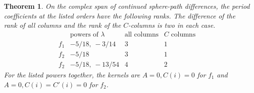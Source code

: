 \documentclass[11pt]{article}
\newtheorem{theorem}{Theorem}
\begin{document}
\begin{theorem}\label{thm:escaped-sphere}
On the complex span of continued sphere-path differences,
the period coefficients at the listed orders have the following ranks. The difference of the
rank of all columns and the rank of the \(C\)-columns is two
in each case.
\[
\begin{array}{c|c|cc}
 &\text{powers of }\lambda&\text{all columns}& C\text{ columns}\\ \hline
 f_1 & -5/18,\ -3/14 &3&1\\
 f_2 & -5/18 &3&1\\
 f_2 & -5/18,\ -13/54 &4&2
\end{array}
\]
For the listed powers together, the kernels are \(A=0,C(i)=0\)
for \(f_1\) and \(A=0,C(i)=C'(i)=0\) for \(f_2\).
\end{theorem}
\end{document}
